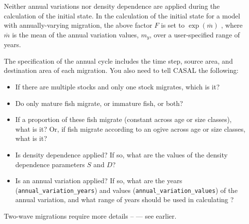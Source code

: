 Neither annual variations nor density dependence are applied during the calculation of the initial state.  In the calculation of the initial state for a model with annually-varying migration, the above factor $F$ is set to $\exp(\overline{m})$  , where $\overline{m}$ is the mean of the annual variation values, $m_y$, over a user-specified range of years. 

The specification of the annual cycle includes the time step, source area, and destination area of each migration. You also need to tell CASAL the following: 

\begin{itemize}
\item If there are multiple stocks and only one stock migrates, which is it?
\item Do only mature fish migrate, or immature fish, or both?
\item If a proportion of these fish migrate (constant across age or size classes), what is it? Or, if fish migrate according to an ogive across age or size classes, what is it?
\item Is density dependence applied? If so, what are the values of the density dependence parameters $S$ and $D$?
\item Is an annual variation applied? If so, what are the years (\texttt{annual\_variation\_years}) and values (\texttt{annual\_variation\_values}) of the annual variation, and what range of years should be used in calculating ?
\end{itemize}

Two-wave migrations require more details \mbox{--} — see earlier.





\paragraph{}

\paragraph{}

\subsection{\label{sec:derived-quantities}}

\subsection{\label{sec:derived-quantity-by-cell}}

